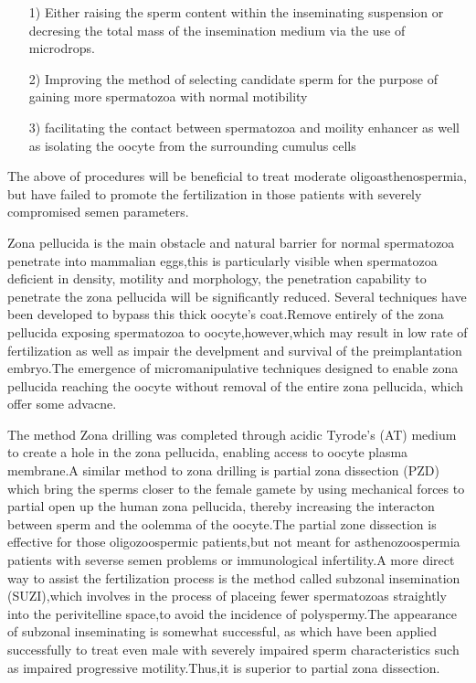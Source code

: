\documentclass[12pt]{article}
\begin{document}
\begin{itemize}
    \item [1)] 
    Either raising the sperm content within the inseminating suspension or decresing the total mass of the insemination medium via the use of microdrops.
    \item [2)] 
    Improving the method of selecting candidate sperm for the purpose of gaining more spermatozoa with normal motibility
    \item [3)]
    facilitating the contact between spermatozoa and moility enhancer as well as isolating the oocyte from the surrounding cumulus cells
\end{itemize}
The above of procedures will be beneficial to treat moderate oligoasthenospermia, but have failed to promote the fertilization in those patients with severely compromised semen parameters.\medskip

Zona pellucida is the main obstacle and natural barrier for normal spermatozoa penetrate into mammalian eggs,this is particularly visible when spermatozoa deficient in density, motility and morphology, the penetration capability to penetrate the zona pellucida will be significantly reduced.
Several techniques have been developed to bypass this thick oocyte's coat.Remove entirely of the zona pellucida exposing spermatozoa to oocyte,however,which may result in low rate of fertilization as well as impair the develpment and survival of the preimplantation embryo.The emergence of micromanipulative techniques designed to enable zona pellucida reaching the oocyte without removal of the entire zona pellucida, which offer some advacne.\medskip


The method Zona drilling was completed through acidic Tyrode’s (AT) medium to create a hole in the zona pellucida, enabling access to oocyte plasma membrane.A similar method to zona drilling is partial zona dissection (PZD) which bring the sperms closer to the female gamete by using mechanical forces to partial open up the human zona pellucida, thereby increasing the interacton between sperm and the oolemma of the oocyte.The partial zone dissection is effective for those oligozoospermic patients,but not meant for asthenozoospermia patients with severse semen problems or immunological infertility.A more direct way to assist the fertilization process is the method called  subzonal insemination (SUZI),which involves in the process of placeing fewer spermatozoas straightly  into the perivitelline space,to avoid the incidence of polyspermy.The appearance of subzonal inseminating is somewhat successful, as which have been applied successfully to treat even male with severely impaired sperm characteristics such as impaired progressive motility.Thus,it is superior to partial zona dissection.\medskip
\end{document}

